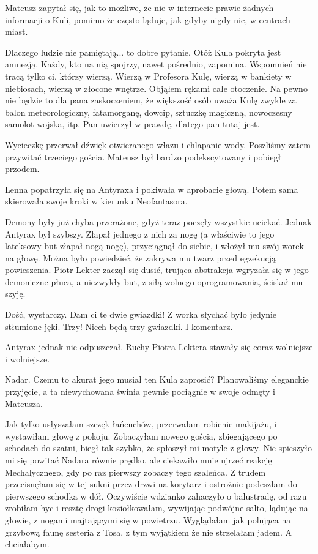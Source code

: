 Mateusz zapytał się, jak to możliwe, że nie w internecie prawie żadnych informacji o Kuli, pomimo że często ląduje, jak gdyby nigdy nic, w centrach miast.
\begin{dialogue}
\ds{} Dlaczego ludzie nie pamiętają... to dobre pytanie.
Otóż Kula pokryta jest amnezją. Każdy, kto na nią spojrzy, nawet pośrednio, zapomina.
Wspomnień nie tracą tylko ci, którzy wierzą. 
Wierzą w Profesora Kulę, wierzą w bankiety w niebiosach, wierzą w złocone wnętrze.
\dm{} Objąłem rękami całe otoczenie. \dm{} 
Na pewno nie będzie to dla pana zaskoczeniem, że większość osób uważa Kulę zwykle za balon meteorologiczny, fatamorganę, dowcip, sztuczkę magiczną, nowoczesny samolot wojska, itp.
Pan uwierzył w prawdę, dlatego pan tutaj jest.
\end{dialogue}

Wycieczkę przerwał dźwięk otwieranego włazu i chlapanie wody.
Poszliśmy zatem przywitać trzeciego gościa. 
Mateusz był bardzo podekscytowany i pobiegł przodem.

\divider{}

Lenna popatrzyła się na Antyraxa i pokiwała w aprobacie głową.
Potem sama skierowała swoje kroki w kierunku Neofantasora.

Demony były już chyba przerażone, gdyż teraz poczęły wszystkie uciekać.
Jednak Antyrax był szybszy. Złapał jednego z nich za nogę (a właściwie to jego lateksowy but złapał nogą nogę), przyciągnął do siebie, i włożył mu swój worek na głowę.
Można było powiedzieć, że zakrywa mu twarz przed egzekucją powieszenia.
Piotr Lekter zaczął się dusić, trująca abstrakcja wgryzała się w jego demoniczne płuca, a niezwykły but, z siłą wolnego oprogramowania, ściskał mu szyję.

\begin{dialogue}
\ds{} Dość, wystarczy. Dam ci te dwie gwiazdki! \dm{} Z worka słychać było jedynie stłumione jęki. \dm{} Trzy! Niech będą trzy gwiazdki. I komentarz.
\end{dialogue}

Antyrax jednak nie odpuszczał. Ruchy Piotra Lektera stawały się coraz wolniejsze i wolniejsze.

\divider{}

Nadar. Czemu to akurat jego musiał ten Kula zaprosić?
Planowaliśmy eleganckie przyjęcie, a ta niewychowana świnia pewnie pociągnie w swoje odmęty i Mateusza.

Jak tylko usłyszałam szczęk łańcuchów, przerwałam robienie makijażu, i wystawiłam głowę z pokoju.
Zobaczyłam nowego gościa, zbiegającego po schodach do szatni, biegł tak szybko, że spłoszył mi motyle z głowy.
Nie spieszyło mi się powitać Nadara równie prędko, ale ciekawiło mnie ujrzeć reakcję Mechalycznego, gdy po raz pierwszy zobaczy tego szaleńca.
Z trudem przecisnęłam się w tej sukni przez drzwi na korytarz i ostrożnie podeszłam do pierwszego schodka w dół.
Oczywiście wdzianko zahaczyło o balustradę, od razu zrobiłam hyc i resztę drogi koziołkowałam, wywijając podwójne salto, lądując na głowie, z nogami majtającymi się w powietrzu.
Wyglądałam jak polująca na grzybową faunę sesteria z Tosa, z tym wyjątkiem że nie strzelałam jadem. A chciałabym.


